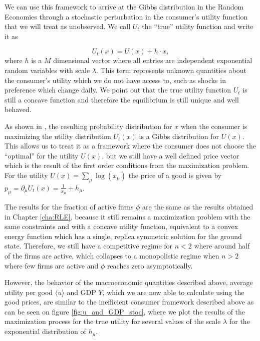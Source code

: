 We can use this framework to arrive at the Gibbs distribution in the Random Economies through a stochastic perturbation in the
consumer's utility function that we will treat as unobserved. We call
$U_t$ the ``true'' utility function and write it as

\begin{equation}
  \label{eq:inef_2}
  U_t(x) = U(x) + h \cdot x,
\end{equation}
where $h$ is a $M$ dimensional vector where all entries are independent
exponential random variables with scale $\lambda$. This term
represents unknown quantities about the consumer's utility which we do
not have access to, such as shocks in preference which change
daily. We point out that the true utility function $U_t$ is still a
concave function and therefore the equilibrium is still unique and
well behaved.

As shown in \cite{Marsili13}, the resulting probability
distribution for $x$ when the consumer is maximizing the utility
distribution $U_t(x)$ is a Gibbs distribution for $U(x)$. This
allows us to treat it as a framework where the consumer does not
choose the ``optimal'' for the utility $U(x)$, but we still have a
well defined price vector which is the result of the first order
conditions from the maximization problem. For the utility
$U(x) = \sum_\mu \log(x_\mu)$ the price of a good is given by
$p_\mu = \partial_\mu U_t(x) = \frac{1}{x_\mu} + h_\mu$.

The results for the fraction of active firms $\phi$ are the same as the results obtained in Chapter \ref{cha:RLE}, because it still remains a maximization problem
with the same constraints and with a concave utility function, equivalent to a convex energy function which has a single, replica
symmetric solution for the ground state. Therefore, we still have a
competitive regime for $n<2$ where around half of the firms are
active, which collapses to a monopolistic regime when $n>2$ where few
firms are active and $\phi$ reaches zero asymptotically.

However, the behavior of the macroeconomic quantities described above,
average utility per good $\langle u \rangle$ and GDP $Y$, which we
are now able to calculate using the good prices, are similar to the
inefficient consumer framework described above as can be seen on
figure \ref{fig:u_and_GDP_stoc}, where we plot the results of the
maximization process for the true utility for several values of the
scale $\lambda$ for the exponential distribution of $h_\mu$.

